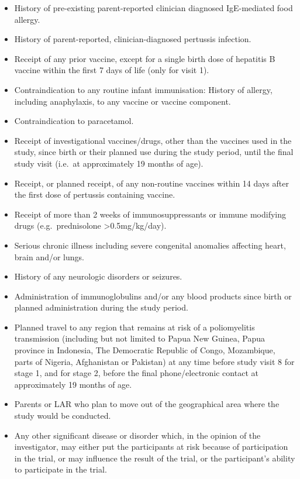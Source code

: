 \documentclass{bmcart}
\begin{document}
\begin{itemize}
	\item History of pre-existing parent-reported clinician diagnosed IgE-mediated food allergy.
	\item History of parent-reported, clinician-diagnosed pertussis infection.
	\item Receipt of any prior vaccine, except for a single birth dose of hepatitis B vaccine within the first 7 days of life (only for visit 1).
	\item Contraindication to any routine infant immunisation: History of allergy, including anaphylaxis, to any vaccine or vaccine component.
	\item Contraindication to paracetamol.
	\item Receipt of investigational vaccines/drugs, other than the vaccines used in the study, since birth or their planned use during the study period, until the final study visit (i.e.~at approximately 19 months of age).
	\item Receipt, or planned receipt, of any non-routine vaccines within 14 days after the first dose of pertussis containing vaccine.
	\item Receipt of more than 2 weeks of immunosuppressants or immune modifying drugs (e.g.~prednisolone \textgreater0.5mg/kg/day).
	\item Serious chronic illness including severe congenital anomalies affecting heart, brain and/or lungs.
	\item History of any neurologic disorders or seizures.
	\item Administration of immunoglobulins and/or any blood products since birth or planned administration during the study period.
	\item Planned travel to any region that remains at risk of a poliomyelitis transmission (including but not limited to Papua New Guinea, Papua province in Indonesia, The Democratic Republic of Congo, Mozambique, parts of Nigeria, Afghanistan or Pakistan) at any time before study visit 8 for stage 1, and for stage 2, before the final phone/electronic contact at approximately 19 months of age.
	\item Parents or LAR who plan to move out of the geographical area where the study would be conducted.
	\item Any other significant disease or disorder which, in the opinion of the investigator, may either put the participants at risk because of participation in the trial, or may influence the result of the trial, or the participant's ability to participate in the trial.
\end{itemize}
\end{document}
